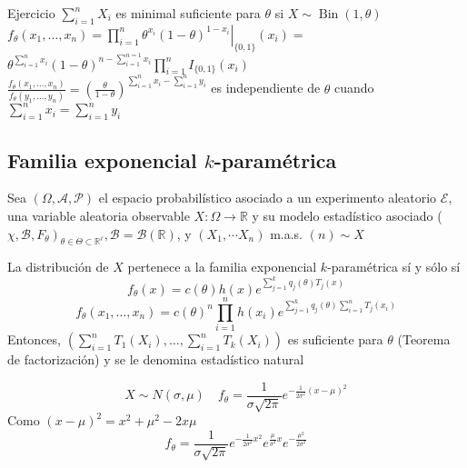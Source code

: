 Ejercicio $\sum_{i=1}^{n} X_{i}$ es minimal suficiente para $\theta$ si $X \sim \operatorname{Bin}(1, \theta)$\\
$f_{\theta}\left(x_{1}, \ldots, x_{n}\right)=\left.\prod_{i=1}^{n} \theta^{x_{i}}(1-\theta)^{1-x_{i}}\right|_{\{0,1\}}\left(x_{i}\right)=$\\
$\theta^{\sum_{i=1}^{n} x_{i}}(1-\theta)^{n-\sum_{i=1}^{n=1} x_{i}} \prod_{i=1}^{n} I_{\{0,1\}}\left(x_{i}\right)$\\
$\frac{f_{\theta}\left(x_{1}, \ldots, x_{n}\right)}{f_{\theta}\left(y_{1}, \ldots, y_{n}\right)}=\left(\frac{\theta}{1-\theta}\right)^{\sum_{i=1}^{n} x_{i}-\sum_{i=1}^{n} y_{i}}$ es independiente de $\theta$ cuando\\
$\sum_{i=1}^{n} x_{i}=\sum_{i=1}^{n} y_{i}$

\subsection*{Familia exponencial $k$-paramétrica}

\begin{definición}
Sea $(\Omega, \mathcal{A}, \mathcal{P})$ el espacio probabilístico asociado a un experimento aleatorio $\mathcal{E}$, una variable aleatoria observable $X: \Omega \longrightarrow \mathbb{R}$ y su modelo estadístico asociado ( $\left.\chi, \mathcal{B}, F_{\theta}\right)_{\theta \in \Theta \subset \mathbb{R}^{\ell}}, \mathcal{B}=\mathcal{B}(\mathbb{R})$, y $\left(X_{1}, \cdots X_{n}\right)$ m.a.s. $(n) \sim X$

La distribución de $X$ pertenece a la familia exponencial $k$-paramétrica sí y sólo sí 
\[f_{\theta}(x)=c(\theta) h(x) e^{\sum_{j=1}^{k} q_{j}(\theta) T_{j}(x)}\]
\[f_{\theta}\left(x_{1}, \ldots, x_{n}\right)=c(\theta)^{n} \prod_{i=1}^{n} h\left(x_{i}\right) e^{\sum_{j=1}^{k} q_{j}(\theta) \sum_{i=1}^{n} T_{j}\left(x_{i}\right)}\]
Entonces, $\left(\sum_{i=1}^{n} T_{1}\left(X_{i}\right), \ldots, \sum_{i=1}^{n} T_{k}\left(X_{i}\right)\right)$ es suficiente para $\theta$ (Teorema de factorización) y se le denomina estadístico natural
\end{definición}

\[X \sim N(\sigma, \mu) \quad f_\theta = \frac{1}{\sigma \sqrt{2\pi}}e^{-\frac{1}{2\sigma^2}(x - \mu)^2}\]
Como $(x- \mu)^2 = x^2 + \mu^2 -2x\mu$\\
\[f_\theta = \frac{1}{\sigma \sqrt{2\pi}}e^{-\frac{1}{2\sigma^2}x^2}e^{\frac{\mu}{\sigma^2}x}e^{-\frac{\mu^2}{2\sigma^2}}\]

